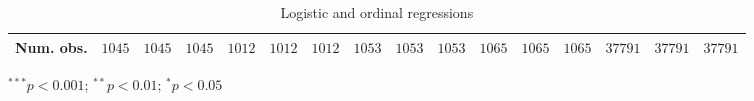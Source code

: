 \begin{table}
\begin{center}
\begin{threeparttable}
\begin{tabular}{l c c c c c c c c c c c c c c c}
Num. obs.                       & $1045$        & $1045$        & $1045$        & $1012$        & $1012$        & $1012$        & $1053$        & $1053$        & $1053$        & $1065$        & $1065$        & $1065$        & $37791$       & $37791$       & $37791$       \\
\bottomrule
\end{tabular}
\begin{tablenotes}[flushleft]
\scriptsize{\item $^{***}p<0.001$; $^{**}p<0.01$; $^{*}p<0.05$}
\end{tablenotes}
\end{threeparttable}
\caption{Logistic and ordinal regressions}
\label{table:coefficients}
\end{center}
\end{table}
